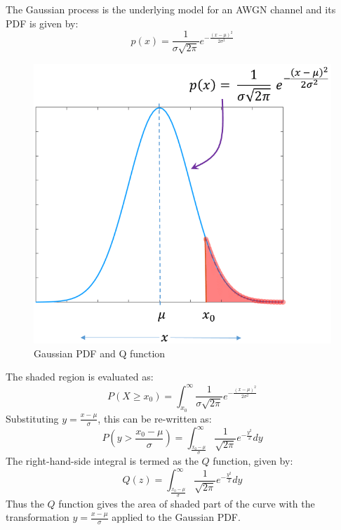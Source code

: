 The Gaussian process is the underlying model for an AWGN channel and its \gls{PDF} is given by:
\[
	p(x) = \frac{1}{\sigma \sqrt{2\pi}}e^{-\frac{(x-\mu)^2}{2\sigma^2}}
\]
\begin{mathDef}
\end{mathDef}
\begin{figure}[!ht]
	\centering
	\includegraphics[scale=0.3]{Graphics/LiteratureReview/Qfunc.png}
	\caption{Gaussian PDF and Q function}
\end{figure}
The shaded region is evaluated as:
\[
	P(X \geq x_0) = \int_{x_0}^\infty \frac{1}{\sigma \sqrt{2\pi}}e^{-\frac{(x-\mu)^2}{2\sigma^2}}
\]
Substituting \(y = \frac{x - \mu}{\sigma}\), this can be re-written as:
\[
	P \left( y > \frac{x_0 - \mu}{\sigma}\right) = \int_{\frac{x_0 - \mu}{\sigma}}^{\infty} \frac{1}{\sqrt{2\pi}}e^{-\frac{y^2}{2}}dy
\]
The right-hand-side integral is termed as the \(Q\) function\cite{statistics}, given by:
\[
	Q(z) = \int_{\frac{x_0 - \mu}{\sigma}}^{\infty} \frac{1}{\sqrt{2\pi}}e^{-\frac{y^2}{2}}dy
\]
Thus the \(Q\) function gives the area of shaded part of the curve with the transformation \(y = \frac{x - \mu}{\sigma}\) applied to the Gaussian \gls{PDF}.

